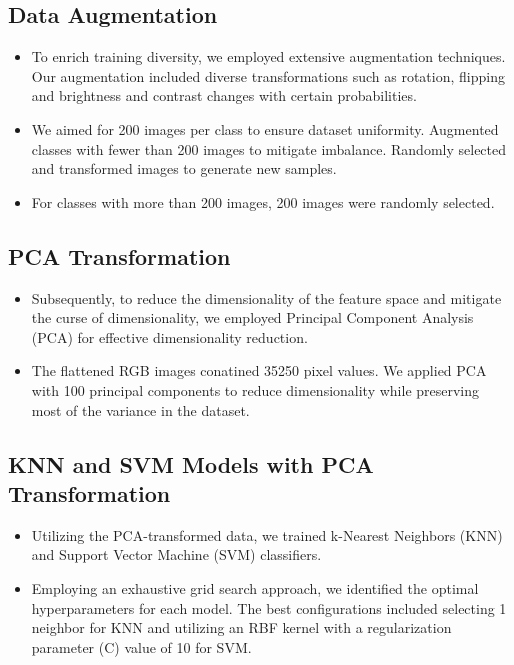 \documentclass[a4paper]{article}
\theoremstyle{plain}
\theoremstyle{definition}
\begin{document}
\subsection{Data Augmentation}
   \begin{itemize}
       \item  To enrich training diversity, we employed extensive augmentation techniques. Our augmentation included diverse transformations such as rotation, flipping and brightness and contrast changes with certain probabilities.
       \item  We aimed for 200 images per class to ensure dataset uniformity. Augmented classes with fewer than 200 images to mitigate imbalance. Randomly selected and transformed images to generate new samples. 
       \item For classes with more than 200 images, 200 images were randomly selected.
   \end{itemize}
   
\subsection{PCA Transformation}
   \begin{itemize}
       \item Subsequently, to reduce the dimensionality of the feature space and mitigate the curse of dimensionality, we employed Principal Component Analysis (PCA) for effective dimensionality reduction. 
       \item The flattened RGB images conatined 35250 pixel values. We applied PCA with 100 principal components to reduce dimensionality while preserving most of the variance in the dataset.
   \end{itemize}
   
\subsection{KNN and SVM Models with PCA Transformation}
   \begin{itemize}
       \item Utilizing the PCA-transformed data, we trained k-Nearest Neighbors (KNN) and Support Vector Machine (SVM) classifiers.
       \item Employing an exhaustive grid search approach, we identified the optimal hyperparameters for each model. The best configurations included selecting 1 neighbor for KNN and utilizing an RBF kernel with a regularization parameter (C) value of 10 for SVM.
   \end{itemize}
\end{document}
